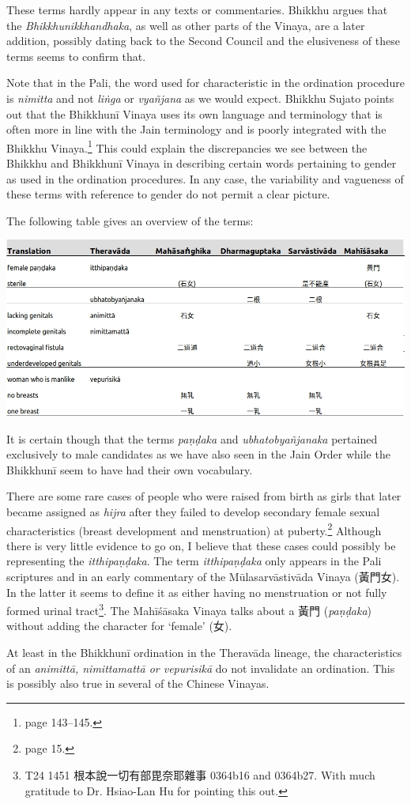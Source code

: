 These terms hardly appear in any texts or commentaries. Bhikkhu \cite{sujato2009} argues that the {\em Bhikkhunikkhandhaka}, as well as other parts of the Vinaya, are a later addition, possibly dating back to the Second Council and the elusiveness of these terms seems to confirm that. 

Note that in the Pali, the word used for characteristic in the ordination procedure is {\em nimitta} and not {\em liṅga} or {\em vyañ­jana} as we would expect. Bhikkhu Sujato points out that the Bhikkhunī Vinaya uses its own language and terminology that is often more in line with the Jain terminology and is poorly integrated with the Bhikkhu Vinaya.\footnote{\cite{sujato2009} page 143–145.} This could explain the discrepancies we see between the Bhikkhu and Bhikkhunī Vinaya in describing certain words pertaining to gender as used in the ordination procedures. In any case, the variability and vagueness of these terms with reference to gender do not permit a clear picture. 

The following table gives an overview of the terms:

\bigskip
\includegraphics[width=\linewidth]{female.jpg}
\label{female}

It is certain though that the terms {\em paṇḍaka} and {\em ubhatob­yañ­janaka} pertained exclusively to male candidates as we have also seen in the Jain Order while the Bhikkhunī seem to have had their own vocabulary.

There are some rare cases of people who were raised from birth as girls that later became assigned as {\em hijra} after they failed to develop secondary female sexual characteristics (breast development and menstruation) at puberty.\footnote{\cite{nanda} page 15.} Although there is very little evidence to go on, I believe that these cases could possibly be representing the {\em itthipaṇḍaka}. The term {\em itthipaṇḍaka} only appears in the Pali scriptures and in an early commentary of the Mūlasarvāstivāda Vinaya (黃門女). In the latter it seems to define it as either having no menstruation or not fully formed urinal tract\footnote{T24 1451 根本說一切有部毘奈耶雜事 0364b16 and 0364b27. With much gratitude to Dr. Hsiao-Lan Hu for pointing this out.}. The Mahīśāsaka Vinaya talks about a 黃門 ({\em paṇḍaka}) without adding the character for `female' (女).

At least in the Bhikkhunī ordination in the Theravāda lineage, the characteristics of an {\em animittā, nimittamattā or vepurisikā} do not invalidate an ordination. This is possibly also true in several of the Chinese Vinayas.
